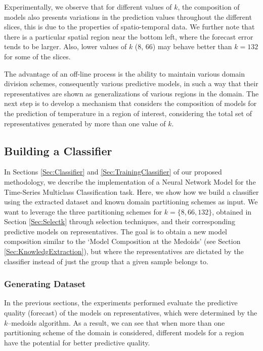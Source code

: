 Experimentally, we observe that for different values of $k$, the composition of models also presents variations in the prediction values throughout the different slices, this is due to the properties of spatio-temporal data. We further note that there is a particular spatial region near the bottom left, where the forecast error tends to be larger. Also, lower values of $k$ (8, 66) may behave better than $k=132$ for some of the slices. 

The advantage of an off-line process is the ability to maintain various domain division schemes, consequently various predictive models, in such a way that their representatives are shown as generalizations of various regions in the domain. The next step is to develop a mechanism that considers the composition of models for the prediction of temperature in a region of interest, considering the total set of representatives generated by more than one value of $k$.

\subsection{Building a Classifier}
\label{Sec:ExperimentsTrainingClassifier}

In Sections \ref{Sec:Classifier} and \ref{Sec:TrainingClassifier} of our proposed methodology, we describe the implementation of a Neural Network Model for the Time-Series Multiclass Classification task. Here, we show how we build a classifier using the extracted dataset and known domain partitioning schemes as input. We want to leverage the three partitioning schemes for $k = \{8, 66, 132\}$, obtained in Section \ref{Sec:Selectk} through selection techniques, and their corresponding predictive models on representatives. The goal is to obtain a new model composition similar to the `Model Composition at the Medoids' (see Section \ref{Sec:KnowledgExtraction}), but where the representatives are dictated by the classifier instead of just the group that a given sample belongs to. 
\subsubsection{Generating Dataset}
\label{Sec:ClassifierDataset}

In the previous sections, the experiments performed evaluate the predictive quality (forecast) of the models on representatives, which were determined by the $k$--medoids algorithm. As a result, we can see that when more than one partitioning scheme of the domain is considered, different models for a region have the potential for better predictive quality.

